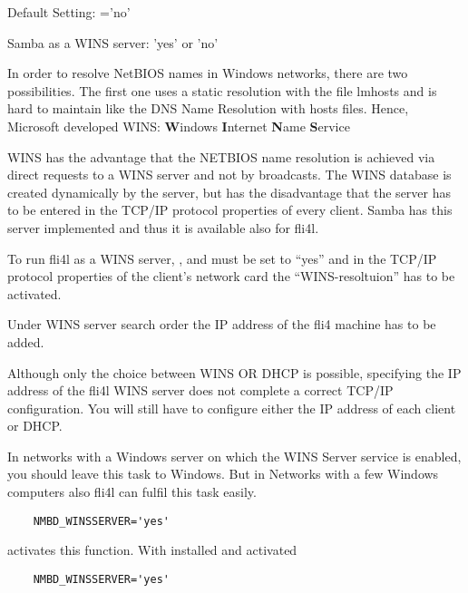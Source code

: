 \begin{description}
  Default Setting: ='no'



  Samba as a WINS server: 'yes' or 'no'

  In order to resolve NetBIOS names in Windows networks, there are two
  possibilities. The first one uses a static resolution with the file
  lmhosts and is hard to maintain like the DNS Name Resolution with hosts files.
  Hence, Microsoft developed WINS:
  \textbf{W}indows \textbf{I}nternet \textbf{N}ame \textbf{S}ervice

  WINS has the advantage that the NETBIOS name resolution is achieved
  via direct requests to a WINS server and not by broadcasts. The
  WINS database is created dynamically by the server, but has the
  disadvantage that the server has to be entered in the TCP/IP protocol
  properties of every client. Samba has this server implemented and
  thus it is available also for fli4l.

  To run fli4l as a WINS server, ,
   and 
  must be set to ``yes'' and in the TCP/IP protocol properties of the
  client's network card the ``WINS-resoltuion'' has to be activated.

  Under WINS server search order the IP address of the fli4 machine
  has to be added.

  Although only the choice between WINS OR DHCP is possible, specifying the
  IP address of the fli4l WINS server does not complete a correct TCP/IP
  configuration. You will still have to configure either the IP address of each client
  or DHCP.

  In networks with a Windows server on which the WINS Server service
  is enabled, you should leave this task to Windows. But in
  Networks with a few Windows computers also fli4l can fulfil this task
  easily.

\begin{example}
\begin{verbatim}
    NMBD_WINSSERVER='yes'
\end{verbatim}
\end{example}

  activates this function.
  With  installed and activated
\begin{example}
\begin{verbatim}
    NMBD_WINSSERVER='yes'
\end{verbatim}
\end{example}


\end{description}
